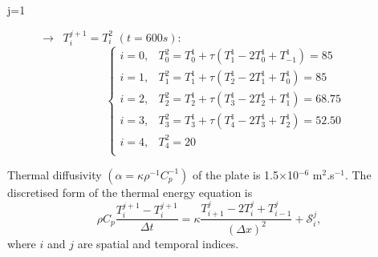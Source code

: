 \documentclass[calculator,datasheet,handbook,solutions]{exam}
\begin{document}
\begin{question}
\begin{enumerate}
\begin{enumerate}[a)]
{\begin{description}
            \item[j=1] $\rightarrow\;\;T_{i}^{j+1}=T_{i}^{2}$ $\left(t=600 s\right)$:
              \begin{displaymath}
                \begin{cases}
                   i=0, & T_{0}^{2} = T_{0}^{1} + \tau\left(T_{1}^{1}-2T_{0}^{1}+T_{-1}^{1}\right) = 85 \\
                   i=1, & T_{1}^{2} = T_{1}^{1} + \tau\left(T_{2}^{1}-2T_{1}^{1}+T_{0}^{1}\right) = 85 \\
                   i=2, & T_{2}^{2} = T_{2}^{1} + \tau\left(T_{3}^{1}-2T_{2}^{1}+T_{1}^{1}\right) = 68.75 \\
                   i=3, & T_{3}^{2} = T_{3}^{1} + \tau\left(T_{4}^{1}-2T_{3}^{1}+T_{2}^{1}\right) = 52.50 \\
                   i=4, & T_{4}^{2} = 20 \\
                \end{cases}
              \end{displaymath}
          \end{description}
          
         }
  \end{enumerate}
    Thermal diffusivity $\left(\alpha=\kappa\rho^{-1}C_{p}^{-1}\right)$ of the plate is 1.5$\times$10$^{-6}$ m$^{2}$.s$^{-1}$. The discretised form of the thermal energy equation is
    \begin{displaymath}
      \rho C_{p}\frac{T_{i}^{j+1}-T_{i}^{j+1}}{\Delta t} = \kappa \frac{T_{i+1}^{j}-2T_{i}^{j}+T_{i-1}^{j}}{\left(\Delta x\right)^{2}} + \mathcal{S}_{i}^{j},
    \end{displaymath}
    where $i$ and $j$ are spatial and temporal indices.


\end{enumerate}
\end{question}
\end{document}
